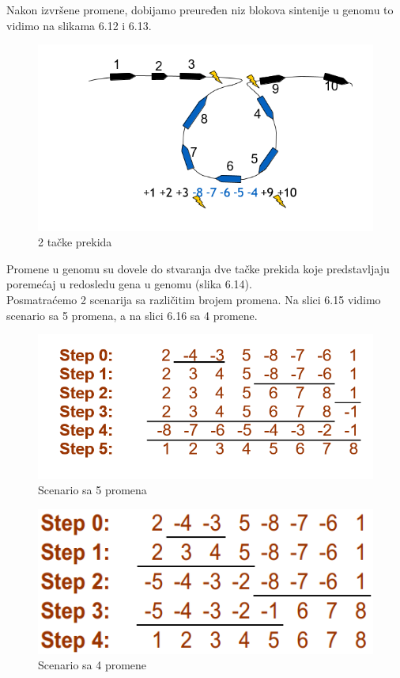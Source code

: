 \noindent Nakon izvršene promene, dobijamo preuređen niz blokova sintenije u genomu to vidimo na slikama 6.12 i 6.13.\\ 

\begin{figure}[h!]
\centering
\includegraphics[scale=0.5]{poglavlja/6/slike/promene4.PNG}
\caption{2 tačke prekida}
\label{slika:X}
\end{figure}

\noindent Promene u genomu su dovele do stvaranja dve tačke prekida koje predstavljaju poremećaj u redosledu gena u genomu (slika 6.14).\\

\noindent Posmatraćemo 2 scenarija sa različitim brojem promena. Na slici 6.15 vidimo scenario sa 5 promena, a na slici 6.16 sa 4 promene.\\

\begin{figure}[h!]
\centering
\includegraphics[scale=0.6]{poglavlja/6/slike/scenario5.PNG}
\caption{Scenario sa 5 promena}
\label{slika:X}
\end{figure}

\begin{figure}[h!]
\centering
\includegraphics[scale=0.7]{poglavlja/6/slike/scenario4.PNG}
\caption{Scenario sa 4 promene}
\label{slika:X}
\end{figure}

